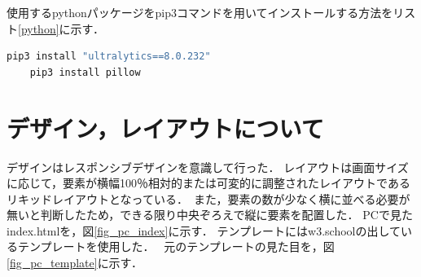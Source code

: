 使用するpythonパッケージをpip3コマンドを用いてインストールする方法をリスト\ref{python}に示す．
\begin{lstlisting}[language=Bash, caption=使用するpythonのモジュールのインストール,label=python]
	pip3 install "ultralytics==8.0.232"
	pip3 install pillow
\end{lstlisting}







\section{デザイン，レイアウトについて}
デザインはレスポンシブデザインを意識して行った．
レイアウトは画面サイズに応じて，要素が横幅100％相対的または可変的に調整されたレイアウトであるリキッドレイアウトとなっている．~\cite{rayout}また，要素の数が少なく横に並べる必要が無いと判断したため，できる限り中央ぞろえで縦に要素を配置した．
PCで見たindex.htmlを，図\ref{fig_pc_index}に示す．
テンプレートにはw3.schoolの出しているテンプレートを使用した．~\cite{template}
元のテンプレートの見た目を，図\ref{fig_pc_template}に示す．

